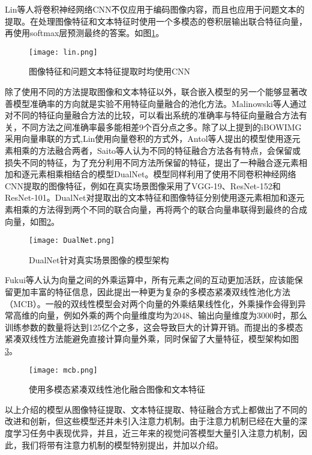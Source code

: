 Lin等人将卷积神经网络CNN不仅应用于编码图像内容，而且也应用于问题文本的提取。在处理图像特征和文本特征时使用一个多模态的卷积层输出联合特征向量，再使用softmax层预测最终的答案。如图\ref{lin}。
\begin{figure}[H]
	\centering
	\texttt{[image: lin.png]}
	\caption{图像特征和问题文本特征提取时均使用CNN}
	\label{lin}
\end{figure}

除了使用不同的方法提取图像和文本特征以外，联合嵌入模型的另一个能够显著改善模型准确率的方向就是实验不用特征向量融合的池化方法。Malinowski等人通过对不同的特征向量融合方法的比较，可以看出系统的准确率与特征向量融合方法有关，不同方法之间准确率最多能相差9个百分点之多。除了以上提到的iBOWIMG采用向量串联的方式,Lin使用向量卷积的方式外，Antol等人提出的模型使用逐元素相乘的方法融合两者，Saito等人认为不同的特征融合方法各有特点，会保留或损失不同的特征，为了充分利用不同方法所保留的特征，提出了一种融合逐元素相加和逐元素相乘相结合的模型DualNet。模型同样利用了使用不同卷积神经网络CNN提取的图像特征，例如在真实场景图像采用了VGG-19、ResNet-152和ResNet-101。DualNet对提取出的文本特征和图像特征分别使用逐元素相加和逐元素相乘的方法得到两个不同的联合向量，再将两个的联合向量串联得到最终的合成向量，如图\ref{DualNet}。
\begin{figure}[H]
	\centering
	\texttt{[image: DualNet.png]}
	\caption{DualNet针对真实场景图像的模型架构}
	\label{DualNet}
\end{figure}

Fukui等人认为向量之间的外乘运算中，所有元素之间的互动更加活跃，应该能保留更加丰富的特征信息，因此提出一种更为复杂的多模态紧凑双线性池化方法（MCB）。一般的双线性模型会对两个向量的外乘结果线性化，外乘操作会得到异常高维的向量，例如外乘的两个向量维度均为2048、输出向量维度为3000时，那么训练参数的数量将达到125亿个之多，这会导致巨大的计算开销。而提出的多模态紧凑双线性方法能避免直接计算向量外乘，同时保留了大量特征，模型架构如图\ref{mcb}。
\begin{figure}[H]
	\centering
	\texttt{[image: mcb.png]}
	\caption{使用多模态紧凑双线性池化融合图像和文本特征}
	\label{mcb}
\end{figure}

以上介绍的模型从图像特征提取、文本特征提取、特征融合方式上都做出了不同的改进和创新，但这些模型还并未引入注意力机制。由于注意力机制已经在大量的深度学习任务中表现优异，并且，近三年来的视觉问答模型大量引入注意力机制，因此，我们将带有注意力机制的模型特别提出，并加以介绍。

